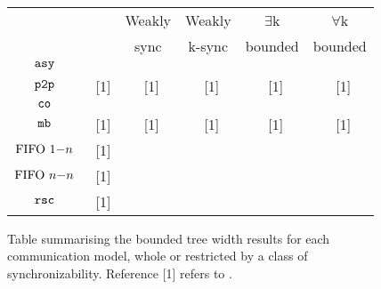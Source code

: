 \newcommand{\cmark}{\ding{51}}%
\newcommand{\xmark}{\ding{55}}%
\begin{figure}[ht]
		\begin{tabular}{|c || c | c | c|  c| c| }
			\hline
			 &  & Weakly  & Weakly  & $\exists$k & $\forall$k  \\
			 & & sync & k-sync & bounded & bounded \\
			\hline \hline
			$\mathtt{asy}$ & \ding{55} & \xmark & \cmark & \cmark & \cmark \\
			\hline
			$\mathtt{p2p}$ & \xmark~[1] & \xmark~[1] & \cmark~[1] & \cmark~[1] & \cmark~[1] \\
			\hline
			$\mathtt{co}$ & \xmark & \xmark & \cmark & \cmark & \cmark \\
			\hline
			$\mathtt{mb}$& \xmark~[1] & \cmark~[1] & \cmark~[1] & \cmark~[1] & \cmark~[1] \\
			\hline
			$\text{FIFO } 1\mathsf{-}n$ & \xmark~[1] & \cmark & \cmark & \cmark & \cmark \\
			\hline
			$\text{FIFO } n\mathsf{-}n$ & \xmark~[1] & \cmark & \cmark & \cmark & \cmark \\
			\hline
			$\mathtt{rsc}$ & \cmark~[1] & \cmark & \cmark & \cmark & \cmark \\
			\hline
		\end{tabular}
		\caption{Table summarising the bounded tree width results for each communication model, whole or restricted by a class of synchronizability. Reference [1] refers to \cite{BolligFG21}. }
		\label{}
\end{figure}
